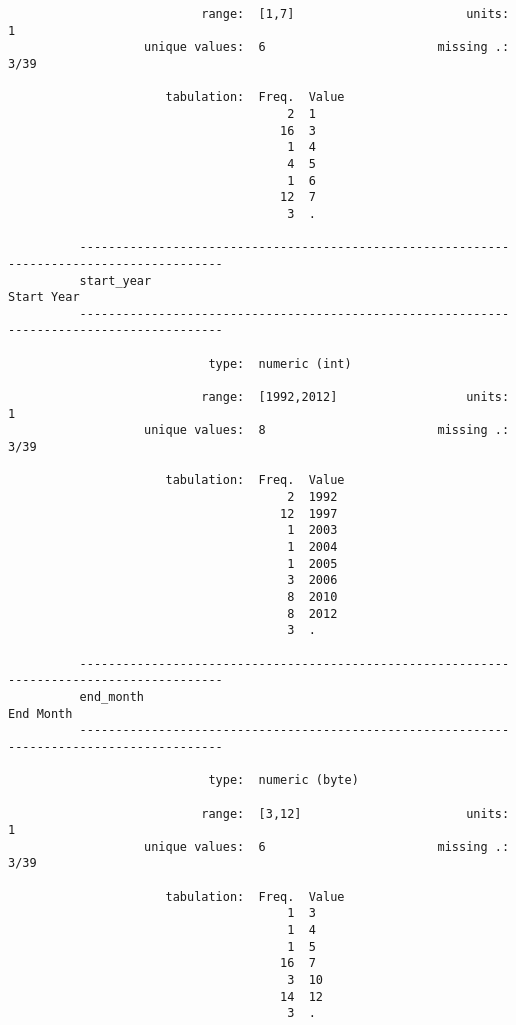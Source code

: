 \documentclass{article}
\begin{document}
\begin{verbatim}
                           range:  [1,7]                        units:  1
                   unique values:  6                        missing .:  3/39
          
                      tabulation:  Freq.  Value
                                       2  1
                                      16  3
                                       1  4
                                       4  5
                                       1  6
                                      12  7
                                       3  .
          
          ------------------------------------------------------------------------------------------
          start_year                                                                      Start Year
          ------------------------------------------------------------------------------------------
          
                            type:  numeric (int)
          
                           range:  [1992,2012]                  units:  1
                   unique values:  8                        missing .:  3/39
          
                      tabulation:  Freq.  Value
                                       2  1992
                                      12  1997
                                       1  2003
                                       1  2004
                                       1  2005
                                       3  2006
                                       8  2010
                                       8  2012
                                       3  .
          
          ------------------------------------------------------------------------------------------
          end_month                                                                        End Month
          ------------------------------------------------------------------------------------------
          
                            type:  numeric (byte)
          
                           range:  [3,12]                       units:  1
                   unique values:  6                        missing .:  3/39
          
                      tabulation:  Freq.  Value
                                       1  3
                                       1  4
                                       1  5
                                      16  7
                                       3  10
                                      14  12
                                       3  .
          

\end{verbatim}
\end{document}
